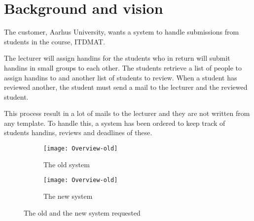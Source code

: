 \documentclass[Main]{subfiles}
\begin{document}
\section{Background and vision}
The customer, Aarhus University, wants a system to handle submissions from students in the course, ITDMAT.

The lecturer will assign handins for the students who in return will submit handins in small groups to each other.
The students retrieve a list of people to assign handins to and another list of students to review.
When a student has reviewed another, the student must send a mail to the lecturer and the reviewed student.

This process result in a lot of mails to the lecturer and they are not written from any template.
To handle this, a system has been ordered to keep track of students handins, reviews and deadlines of these.

\begin{figure}[H]
	\centering
	\begin{subfigure}[b]{0.55\textwidth}
		\texttt{[image: Overview-old]}
		\caption{The old system}
		\label{fig:overview-old}
	\end{subfigure}
	
	\begin{subfigure}[b]{0.55\textwidth}
		\texttt{[image: Overview-old]}
		\caption{The new system}
		\label{fig:overview-new}
	\end{subfigure}
	\caption{The old and the new system requested}\label{fig:overview}
\end{figure}
\end{document}
